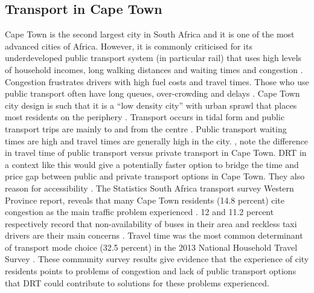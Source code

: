 \documentclass[a4paper]{article}
\begin{document}

\subsection*{Transport in Cape Town}

Cape Town is the second largest city in South Africa and it is one of the most advanced cities of Africa. However, it is commonly criticised for its underdeveloped public transport system (in particular rail) that uses high levels of household incomes, long walking distances and waiting times and congestion \citep{StateofCT, jennings2015finding}.
Congestion frustrates drivers with high fuel costs and travel times. Those who use public transport often have long queues, over-crowding and delays \citep{jennings2015finding}.
Cape Town city design is such that it is a “low density city” with urban sprawl that places most residents on the periphery \citep{Turok2011, jennings2015finding}. Transport occurs in tidal form and public transport trips are mainly to and from the centre \citep{Turok2011, jennings2015finding}. Public transport waiting times are high and travel times are generally high in the city. \citealp{hitge2015comparison}, note the difference in travel time of public transport versus private transport in Cape Town. DRT in a context like this would give a potentially faster option to bridge the time and price gap between public and private transport options in Cape Town. They also reason for accessibility \citep{hitge2015comparison}.
The Statistics South Africa transport survey Western Province report, reveals that many Cape Town residents (14.8 percent) cite congestion as the main traffic problem experienced  \citep{StatsSAreport}.
12 and 11.2 percent respectively record that non-availability of buses in their area and reckless taxi drivers are their main concerns \citep{StatsSAreport}. 
Travel time was the most common determinant of transport mode choice (32.5 percent) in the 2013 National Household Travel Survey \citep{StatsSA14}.
These community survey results give evidence that the experience of city residents points to problems of congestion and lack of public transport options that DRT could contribute to solutions for these problems experienced. \\
\end{document}

